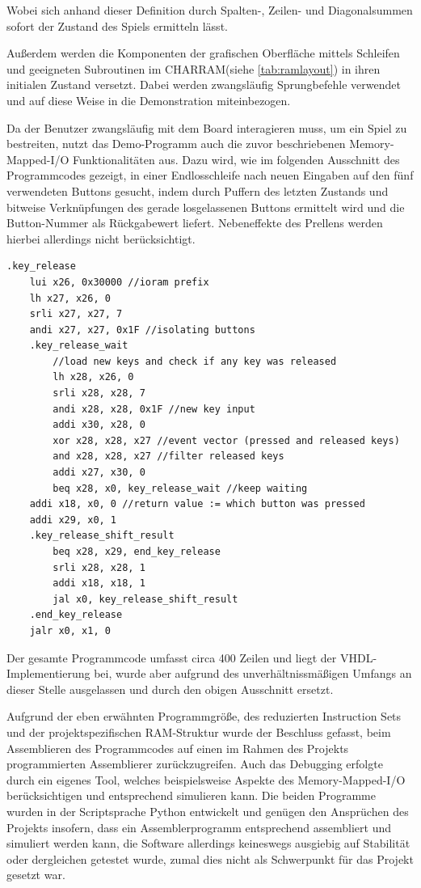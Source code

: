 Wobei sich anhand dieser Definition durch Spalten-, Zeilen- und Diagonalsummen sofort der Zustand des Spiels ermitteln l\"asst.

Au\ss{}erdem werden die Komponenten der grafischen Oberfl\"ache mittels Schleifen und geeigneten Subroutinen im CHARRAM(siehe \ref{tab:ramlayout}) in ihren initialen Zustand versetzt. Dabei werden zwangsl\"aufig Sprungbefehle verwendet und auf diese Weise in die Demonstration miteinbezogen.

Da der Benutzer zwangsl\"aufig mit dem Board interagieren muss, um ein Spiel zu bestreiten, nutzt das Demo-Programm auch die zuvor beschriebenen Memory-Mapped-I/O Funktionalit\"aten aus. Dazu wird, wie im folgenden Ausschnitt des Programmcodes gezeigt, in einer Endlosschleife nach neuen Eingaben auf den f\"unf verwendeten Buttons gesucht, indem durch Puffern des letzten Zustands und bitweise Verkn\"upfungen des gerade losgelassenen Buttons ermittelt wird und die Button-Nummer als R\"uckgabewert liefert. Nebeneffekte des Prellens werden hierbei allerdings nicht ber\"ucksichtigt.

\begin{lstlisting}
.key_release
	lui x26, 0x30000 //ioram prefix
	lh x27, x26, 0
	srli x27, x27, 7
	andi x27, x27, 0x1F //isolating buttons
	.key_release_wait
		//load new keys and check if any key was released
		lh x28, x26, 0
		srli x28, x28, 7
		andi x28, x28, 0x1F //new key input
		addi x30, x28, 0
		xor x28, x28, x27 //event vector (pressed and released keys)
		and x28, x28, x27 //filter released keys
		addi x27, x30, 0
		beq x28, x0, key_release_wait //keep waiting
	addi x18, x0, 0 //return value := which button was pressed
	addi x29, x0, 1
	.key_release_shift_result
		beq x28, x29, end_key_release
		srli x28, x28, 1
		addi x18, x18, 1
		jal x0, key_release_shift_result
	.end_key_release
	jalr x0, x1, 0
\end{lstlisting}

Der gesamte Programmcode umfasst circa 400 Zeilen und liegt der VHDL-Implementierung bei, wurde aber aufgrund des unverh\"altnissm\"a\ss{}igen Umfangs an dieser Stelle ausgelassen und durch den obigen Ausschnitt ersetzt.


Aufgrund der eben erw\"ahnten Programmgr\"o\ss{}e, des reduzierten Instruction Sets und der projektspezifischen RAM-Struktur wurde der Beschluss gefasst, beim Assemblieren des Programmcodes auf einen im Rahmen des Projekts programmierten Assemblierer zur\"uckzugreifen. Auch das Debugging erfolgte durch ein eigenes Tool, welches beispielsweise Aspekte des Memory-Mapped-I/O ber\"ucksichtigen und entsprechend simulieren kann. Die beiden Programme wurden in der Scriptsprache Python entwickelt und gen\"ugen den Anspr\"uchen des Projekts insofern, dass ein Assemblerprogramm entsprechend assembliert und simuliert werden kann, die Software allerdings keineswegs ausgiebig auf Stabilit\"at oder dergleichen getestet wurde, zumal dies nicht als Schwerpunkt f\"ur das Projekt gesetzt war.

